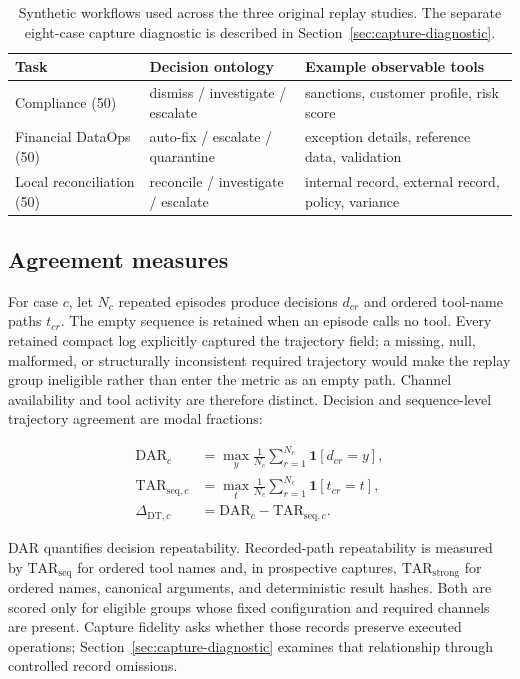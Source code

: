 \documentclass{article}
\newcommand{\dar}{\mathrm{DAR}}
\newcommand{\tarseq}{\mathrm{TAR}_{\mathrm{seq}}}
\newcommand{\tarstrong}{\mathrm{TAR}_{\mathrm{strong}}}
\begin{document}
\begin{table}[t]
\caption{Synthetic workflows used across the three original replay studies.
The separate eight-case capture diagnostic is described in
Section~\ref{sec:capture-diagnostic}.}
\label{tab:tasks}
\centering
\small
\begin{tabular}{@{}p{}p{}p{}@{}}
\toprule
Task & Decision ontology & Example observable tools \\
\midrule
Compliance (50) & dismiss / investigate / escalate & sanctions, customer profile, risk score \\
Financial DataOps (50) & auto-fix / escalate / quarantine & exception details, reference data, validation \\
Local reconciliation (50) & reconcile / investigate / escalate & internal record, external record, policy, variance \\
\bottomrule
\end{tabular}
\end{table}

\subsection{Agreement measures}

For case \(c\), let \(N_c\) repeated episodes produce decisions \(d_{cr}\) and
ordered tool-name paths \(t_{cr}\).  The empty sequence is retained when an
episode calls no tool.  Every retained compact log explicitly captured the
trajectory field; a missing, null, malformed, or structurally inconsistent
required trajectory would make the replay group ineligible rather than enter
the metric as an empty path.  Channel availability and tool activity are
therefore distinct.  Decision and sequence-level trajectory agreement are modal
fractions:

\begin{align}
\dar_c &= \max_y \frac{1}{N_c}\sum_{r=1}^{N_c}\mathbf{1}[d_{cr}=y], \\
\mathrm{TAR}_{\mathrm{seq},c} &= \max_t \frac{1}{N_c}\sum_{r=1}^{N_c}\mathbf{1}[t_{cr}=t], \\
\Delta_{\mathrm{DT},c} &= \dar_c-\mathrm{TAR}_{\mathrm{seq},c}.
\end{align}

DAR quantifies decision repeatability.  Recorded-path repeatability is measured by
\(\tarseq\) for ordered tool names and, in prospective captures,
\(\tarstrong\) for ordered names, canonical arguments, and deterministic result
hashes.  Both are scored only for eligible groups whose fixed configuration and
required channels are present.  Capture fidelity asks whether those records
preserve executed operations; Section~\ref{sec:capture-diagnostic} examines
that relationship through controlled record omissions.
\end{document}
